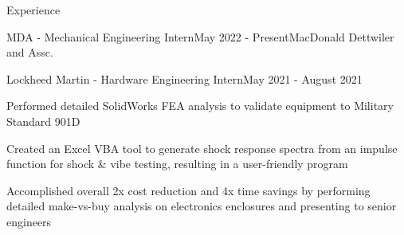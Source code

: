 \documentclass{resume} %
\begin{document}
\begin{rSection}{Experience}
\begin{rSubsection}{MDA - Mechanical Engineering Intern}{May 2022 - Present}{MacDonald Dettwiler and Assc.}{}
\end{rSubsection}


\begin{rSubsection}{Lockheed Martin - Hardware Engineering Intern}{May 2021 - August 2021}{}{}

\item Performed detailed SolidWorks FEA analysis to validate equipment to Military Standard 901D
\item Created an Excel VBA tool to generate shock response spectra from an impulse function for shock \& vibe testing, resulting in a user-friendly program
\item Accomplished overall 2x cost reduction and 4x time savings by performing detailed make-vs-buy analysis on electronics enclosures and presenting to senior engineers

\end{rSubsection}

\begin{comment}
\begin{rSubsection}{Department of National Defense - Engineering Intern}{May 2020 - September 2020}{}{}

\item Documented and presented key specifications on armored patrol vehicles for 411 vehicles in 69 variants
\item Reworked procurement documents based on technical requirements from multiple military bases
\item Proofread english-to-french translations of contracts to ensure correctness

\end{rSubsection}

\end{rSection}

\begin{rSection}{Projects \& Publications}

\begin{rSubsection}{Undergraduate Publication}{September 2021 - December 2021}{An Investigation of Magnetic Radiation Shields for Human Space Habitats}{Awad et al.}
\item Designed and conducted an experiment over 6 weeks to measure the viability of a superconducting magnet as an active shield from radiation, GCRs, and lunar regolith for lightweight space travel applications
\item Manufactured a vacuum chamber with a cooling tube configuration, wire feed-through, and a beta particle detector capable of maintaining a vacuum of 0.1 Pa to minimize particle stopping power and reduce condensation
\item Designed superconducting magnet configurations made of superconducting YBCO tape with a vacuum-tight cooling system to maintain critical temperatures of 77K
\item Created a Python program to perform in-depth analysis of the raw data, including noise filtering, curve fitting, and extrapolation to demonstrate clear trends


\end{comment}
\end{rSection}
\end{document}
